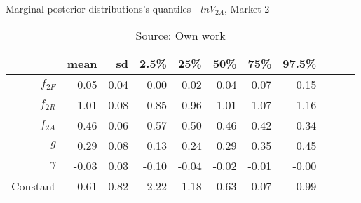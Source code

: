 \begin{table}[H]
\caption{Marginal posterior distributions's quantiles - $ln V_{2A}$,  Market 2}
\centering
\begin{tabular}{rrrrrrrrrrr}
  \toprule
           & mean  & sd   & 2.5\% & 25\%  & 50\%  & 75\%  & 97.5\% \\ 
  \hline
  $f_{2F}$ & 0.05  & 0.04 & 0.00  & 0.02  & 0.04  & 0.07  & 0.15  \\ 
  $f_{2R}$ & 1.01  & 0.08 & 0.85  & 0.96  & 1.01  & 1.07  & 1.16  \\ 
  $f_{2A}$ & -0.46 & 0.06 & -0.57 & -0.50 & -0.46 & -0.42 & -0.34 \\ 
  $g$      & 0.29  & 0.08 & 0.13  & 0.24  & 0.29  & 0.35  & 0.45  \\ 
  $\gamma$ & -0.03 & 0.03 & -0.10 & -0.04 & -0.02 & -0.01 & -0.00 \\ 
  Constant & -0.61 & 0.82 & -2.22 & -1.18 & -0.63 & -0.07 & 0.99  \\ 
     \bottomrule
\end{tabular}
\caption*{Source: Own work}
\end{table}
